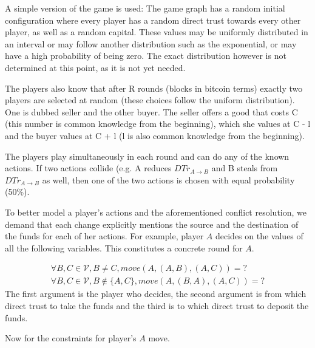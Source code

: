 \newpage

A simple version of the game is used: The game graph has a random initial configuration where every player has a random direct
trust towards every other player, as well as a random capital. These values may be uniformly distributed in an interval or may
follow another distribution such as the exponential, or may have a high probability of being zero. The exact distribution
however is not determined at this point, as it is not yet needed.

The players also know that after R rounds (blocks in bitcoin terms) exactly two players are selected at random (these choices
follow the uniform distribution). One is dubbed seller and the other buyer. The seller offers a good that costs C (this number
is common knowledge from the beginning), which she values at C - l and the buyer values at C + l (l is also common knowledge
from the beginning).

The players play simultaneously in each round and can do any of the known actions. If two actions collide (e.g. A reduces
$DTr_{A \rightarrow B}$ and B steals from $DTr_{A \rightarrow B}$ as well, then one of the two actions is chosen with equal
probability (50\%).

To better model a player's actions and the aforementioned conflict resolution, we demand that each change explicitly mentions
the source and the destination of the funds for each of her actions. For example, player $A$ decides on the values of all the
following variables. This constitutes a concrete round for $A$.

\begin{align}
  \forall B, C \in \mathcal{V}, B \neq C, move\left(A, \left(A, B\right), \left(A, C\right) \right) = ? \\
  \forall B, C \in \mathcal{V}, B \notin \{A, C\}, move\left(A, \left(B, A\right), \left(A, C\right) \right) = ?
\end{align}
The first argument is the player who decides, the second argument is from which direct trust to take the funds and the third
is to which direct trust to deposit the funds.

Now for the constraints for player's $A$ move.

